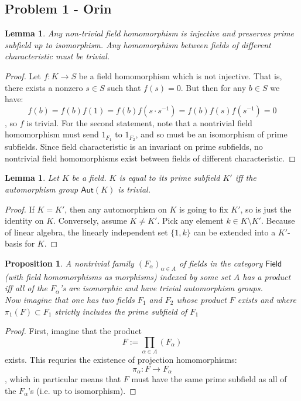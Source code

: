 \documentclass{article}
\newtheorem{proposition}[subsection]{Proposition}
\newtheorem{lemma}[subsection]{Lemma}
\begin{document}
\subsection{Problem 1 - Orin}
\begin{lemma}
	Any non-trivial field homomorphism is injective and preserves prime subfield up to isomorphism.  Any homomorphism between fields of different characteristic must be trivial.
\end{lemma}
\begin{proof}
	Let $f: K\rightarrow{S}$ be a field homomorphism which is not injective.  That is, there exists a nonzero $s\in S$ such that $f(s)=0$.  But then for any $b\in S$ we have: $$f(b) = f(b)f(1)=f(b)f(s\cdot{s^{-1}})=f(b)f(s)f(s^{-1})=0$$, so $f$ is trivial.  For the second statement, note that a nontrivial field homomorphism must send $1_{F_1}$ to $1_{F_2}$, and so must be an isomorphism of prime subfields.  Since field characteristic is an invariant on prime subfields, no nontrivial field homomorphisms exist between fields of different characteristic. 
\end{proof}
\begin{lemma}
	Let $K$ be a field.  $K$ is equal to its prime subfield $K'$ iff the automorphism group $\textsf{Aut}(K)$ is trivial.
\end{lemma}
\begin{proof}
	If $K=K'$, then any automorphism on $K$ is going to fix $K'$, so is just the identity on $K$.  Conversely, assume $K\neq K'$.  Pick any element $k\in K\setminus K'$.  Because of linear algebra, the linearly independent set $\{1,k\}$ can be extended into a $K'$-basis for $K$.
\end{proof}
\begin{proposition}
	A nontrivial family $(F_\alpha)_{\alpha\in A}$ of fields in the category $\textsf{Field}$ (with field homomorphisms as morphisms) indexed by some set $A$ has a product iff all of the $F_\alpha$'s are isomorphic and have trivial automorphism groups. \\Now imagine that one has two fields $F_1$ and $F_2$ whose product $F$ exists and where $\pi_1(F)\subset F_1$ strictly includes the prime subfield of $F_1$
\end{proposition}
\begin{proof}
	First, imagine that the product $$F:=\prod_{\alpha\in A}(F_\alpha)$$ exists.  This requries the existence of projection homomorphisms: $$\pi_\alpha: F\rightarrow F_\alpha$$, which in particular means that $F$ must have the same prime subfield as all of the $F_\alpha$'s (i.e. up to isomorphism).
\end{proof}
\end{document}
